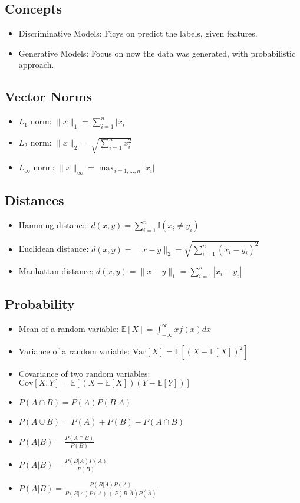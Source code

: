 \documentclass[a4paper,7pt]{extarticle}
\theoremstyle{definition}
\begin{document}
\begin{multicols*}{2}

\subsection{Concepts}

\begin{itemize}
\item Discriminative Models: Ficys on predict the labels, given features.
\item Generative Models: Focus on now the data was generated, with probabilistic approach.
\end{itemize}

\subsection{Vector Norms}

\begin{itemize}
\item $L_1$ norm: $\|x\|_1 = \sum_{i=1}^n |x_i|$
\item $L_2$ norm: $\|x\|_2 = \sqrt{\sum_{i=1}^n x_i^2}$
\item $L_\infty$ norm: $\|x\|_\infty = \max_{i=1,\ldots,n} |x_i|$
\end{itemize}

\subsection{Distances}

\begin{itemize}
\item Hamming   distance: $d(x, y) = \sum_{i=1}^n \mathbb{I}(x_i \neq y_i)$
\item Euclidean distance: $d(x, y) = \|x - y\|_2 = \sqrt{\sum_{i=1}^n (x_i - y_i)^2}$
\item Manhattan distance: $d(x, y) = \|x - y\|_1 = \sum_{i=1}^n |x_i - y_i|$
\end{itemize}

\subsection{Probability}

\begin{itemize}
\item Mean of a random variable: $\mathbb{E}[X] = \int_{-\infty}^\infty x f(x) dx$
\item Variance of a random variable: $\text{Var}[X] = \mathbb{E}[(X - \mathbb{E}[X])^2]$
\item Covariance of two random variables: $\text{Cov}[X, Y] = \mathbb{E}[(X - \mathbb{E}[X])(Y - \mathbb{E}[Y])]$    
\item $P(A \cap B) = P(A) P(B|A)$
\item $P(A \cup B) = P(A) + P(B) - P(A \cap B)$
\item $P(A|B) = \frac{P(A \cap B)}{P(B)}$
\item $P(A|B) = \frac{P(B|A) P(A)}{P(B)}$
\item $P(A|B) = \frac{P(B|A) P(A)}{P(B|A) P(A) + P(B|\bar{A}) P(\bar{A})}$
\end{itemize}


\end{multicols*}
\end{document}
